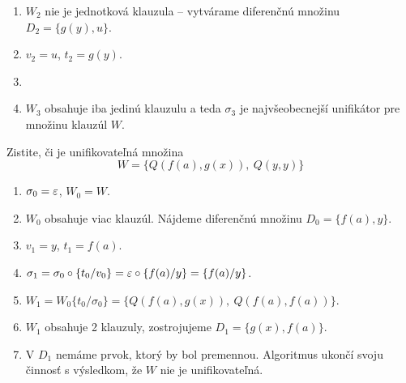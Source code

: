 \begin{priklad}
\begin{enumerate}
	\item $W_2$ nie je jednotková klauzula -- vytvárame diferenčnú množinu
	    $D_2 = \{ g(y), u \}$.
        \item $v_2 = u$, $t_2 = g(y)$.

	\item {}
	\item $W_3$ obsahuje iba jedinú klauzulu a teda 
            $\sigma_3$ je najvšeobecnejší unifikátor pre množinu klauzúl $W$.
\end{enumerate}
\end{priklad}


\begin{priklad}
    Zistite, či je unifikovateľná množina 
    \begin{equation*}
        W=\{Q(f(a),g(x)),\ Q(y,y)\}
    \end{equation*}

    \begin{enumerate}
    \item $\sigma_0 = \varepsilon$, $W_0 = W$.

    \item $W_0$ obsahuje viac klauzúl.
        Nájdeme diferenčnú množinu $D_0 = \{f(a), y \}$.

    \item $v_1=y$, $t_1=f(a)$.

    \item $\sigma_1 = \sigma_0 \circ \{ t_0/v_0\} = 
                \varepsilon \circ  \{f(a)/y\} = \{f(a)/y\}$.

    \item $W_1 = W_0 \{ t_0/\sigma_0\} = \{ Q(f(a),g(x)),\
        Q(f(a),f(a))\}$.

    \item $W_1$ obsahuje 2 klauzuly,
        zostrojujeme $D_1 = \{g(x), f(a)\}$.

    \item V $D_1$ nemáme prvok, ktorý by bol premennou.
        Algoritmus ukončí svoju činnosť s výsledkom, že
        $W$ nie je unifikovateľná.
    \end{enumerate}
\end{priklad}

